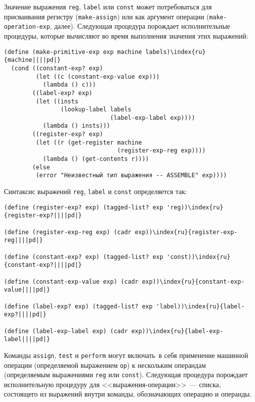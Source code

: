 Значение выражения {\tt reg}, {\tt label}
или {\tt const} 
может потребоваться для присваивания регистру
({\tt make-assign}) или как аргумент операции
({\tt make-ope\-ra\-tion-exp}, далее).  Следующая процедура
порождает исполнительные процедуры, которые вычисляют во время
выполнения значения этих выражений:

\begin{Verbatim}[fontsize=\small]
(define (make-primitive-exp exp machine labels)\index{ru}{machine||||pd|}
  (cond ((constant-exp? exp)
         (let ((c (constant-exp-value exp)))
           (lambda () c)))
        ((label-exp? exp)
         (let ((insts
                (lookup-label labels
                              (label-exp-label exp))))
           (lambda () insts)))
        ((register-exp? exp)
         (let ((r (get-register machine
                                (register-exp-reg exp))))
           (lambda () (get-contents r))))
        (else
         (error "Неизвестный тип выражения -- ASSEMBLE" exp))))
\end{Verbatim}
Синтаксис выражений {\tt reg}, {\tt label} и
{\tt const} определяется так:

\begin{Verbatim}[fontsize=\small]
(define (register-exp? exp) (tagged-list? exp 'reg))\index{ru}{register-exp?||||pd|}

(define (register-exp-reg exp) (cadr exp))\index{ru}{register-exp-reg||||pd|}

(define (constant-exp? exp) (tagged-list? exp 'const))\index{ru}{constant-exp?||||pd|}

(define (constant-exp-value exp) (cadr exp))\index{ru}{constant-exp-value||||pd|}

(define (label-exp? exp) (tagged-list? exp 'label))\index{ru}{label-exp?||||pd|}

(define (label-exp-label exp) (cadr exp))\index{ru}{label-exp-label||||pd|}
\end{Verbatim}

Команды {\tt assign}, {\tt test} и
{\tt perform} могут включать~в себя применение машинной
операции (определяемой выражением {\tt op}) к нескольким
операндам (определяемым выражениями {\tt reg} или
{\tt const}). Следующая процедура порождает исполнительную
процедуру для <<выражения-операции>>~--- списка, состоящего из
выражений внутри команды, обозначающих операцию и операнды.

